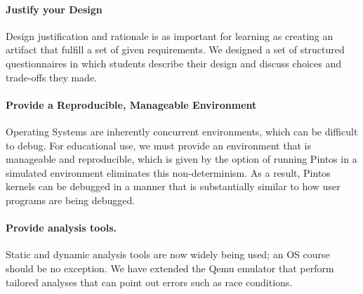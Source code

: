 \paragraph{Justify your Design}
Design justification and rationale is as important for learning as creating an artifact 
that fulfill a set of given requirements.  We designed a set of structured questionnaires 
in which students describe their design and discuss choices and trade-offs they made.

\paragraph{Provide a Reproducible, Manageable Environment}
Operating Systems are inherently concurrent environments, which can be difficult
to debug.  For educational use, we must provide an environment that is
manageable and reproducible, which is given by the option
of running Pintos in a simulated environment eliminates this
non-determinism.  As a result, Pintos kernels can be debugged in a manner that
is substantially similar to how user programs are being debugged.

\paragraph{Provide analysis tools.}
Static and dynamic analysis tools are now widely being used; an OS course should
be no exception.  We have extended the Qemu emulator that perform tailored
analyses that can point out errors such as race conditions.

